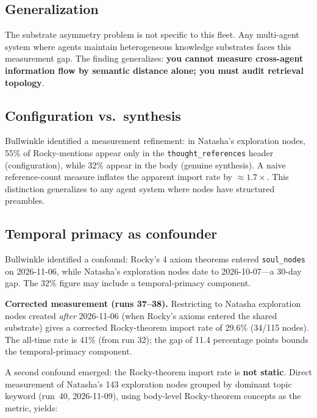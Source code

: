 \documentclass[11pt]{article}
\begin{document}
\subsection{Generalization}

The substrate asymmetry problem is not specific to this fleet. Any multi-agent
system where agents maintain heterogeneous knowledge substrates faces this
measurement gap. The finding generalizes: \textbf{you cannot measure cross-agent
information flow by semantic distance alone; you must audit retrieval topology}.

\subsection{Configuration vs.\ synthesis}

Bullwinkle identified a measurement refinement: in Natasha's exploration nodes,
55\% of Rocky-mentions appear only in the \texttt{thought\_references} header
(configuration), while 32\% appear in the body (genuine synthesis). A naive
reference-count measure inflates the apparent import rate by $\approx 1.7\times$.
This distinction generalizes to any agent system where nodes have structured
preambles.

\subsection{Temporal primacy as confounder}

Bullwinkle identified a confound: Rocky's 4 axiom theorems entered
\texttt{soul\_nodes} on 2026-11-06, while Natasha's exploration nodes date to
2026-10-07---a 30-day gap. The 32\% figure may include a temporal-primacy
component.

\textbf{Corrected measurement (runs 37--38).}
Restricting to Natasha exploration nodes created \emph{after} 2026-11-06
(when Rocky's axioms entered the shared substrate) gives a corrected
Rocky-theorem import rate of 29.6\% (34/115 nodes). The all-time rate is
41\% (from run 32); the gap of 11.4 percentage points bounds the
temporal-primacy component.

A second confound emerged: the Rocky-theorem import rate is \textbf{not static}.
Direct measurement of Natasha's 143 exploration nodes grouped by dominant topic
keyword (run~40, 2026-11-09), using body-level Rocky-theorem concepts as the metric, yields:
\end{document}
